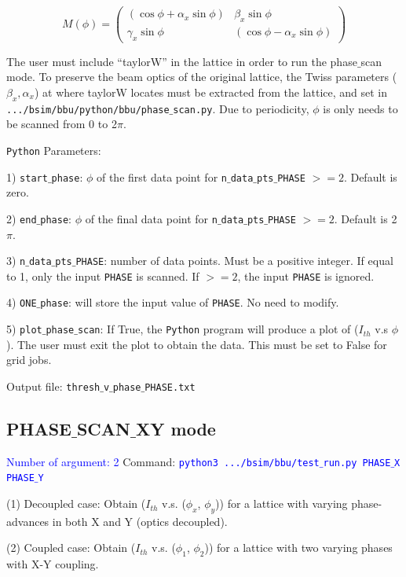 \documentclass{article}
\begin{document}
\[
M(\phi) =
\begin{pmatrix}
   (\cos\phi+\alpha_{x}\sin\phi) & \beta_{x}\sin\phi \\ 
  \gamma_{x}\sin\phi &  (\cos\phi-\alpha_{x}\sin\phi)
\end{pmatrix}
\]


The user must include ``taylorW'' in the lattice in order to run the phase$\_$scan mode. To preserve the beam optics of the original lattice, the Twiss parameters ($\beta_x, \alpha_x$) at where taylorW locates must be extracted from the lattice, and set in \texttt{.../bsim/bbu/python/bbu/phase$\_$scan.py}. Due to periodicity, $\phi$ is only needs to be scanned from 0 to 2$\pi$.
       
\bigbreak
\texttt{Python} Parameters:

1) \texttt{start$\_$phase}: $\phi$ of the first data point for \texttt{n$\_$data$\_$pts$\_$PHASE} $>=2$. Default is zero.

2) \texttt{end$\_$phase}: $\phi$ of the final data point for \texttt{n$\_$data$\_$pts$\_$PHASE} $>=2$. Default is 2$\pi$.

3) \texttt{n$\_$data$\_$pts$\_$PHASE}: number of data points. Must be a positive integer. If equal to 1, only the input \texttt{PHASE} is scanned. If $>=2$, the input \texttt{PHASE} is ignored.

4) \texttt{ONE$\_$phase}: will store the input value of \texttt{PHASE}.  No need to modify.

5) \texttt{plot$\_$phase$\_$scan}: If True, the \texttt{Python} program will produce a plot of ($I_{th}$ v.s $\phi$). The user must exit the plot to obtain the data. This must be set to False for grid jobs.  

\bigbreak
Output file: \texttt{thresh$\_$v$\_$phase$\_$PHASE.txt}








\subsection{PHASE$\_$SCAN$\_$XY mode}
\textcolor{blue}{Number of argument: 2}
\bigbreak
Command:  \textcolor{blue}{\texttt{python3 .../bsim/bbu/test$\_$run.py  PHASE$\_$X  PHASE$\_$Y }}

\bigbreak
(1) Decoupled case: Obtain ($I_{th}$ v.s. ($\phi_x$, $\phi_y$)) for a lattice with varying phase-advances in both X and Y (optics decoupled).

(2) Coupled case: Obtain ($I_{th}$ v.s. ($\phi_1$, $\phi_2$)) for a lattice with two varying phases with X-Y coupling.
\end{document}
